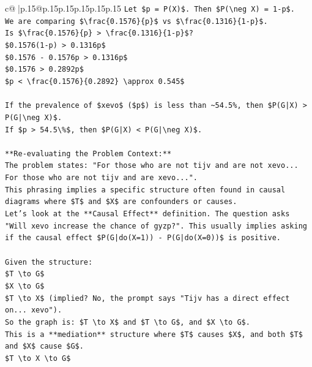\documentclass{article}
\begin{document}
{\begin{supertabular}{c@{$\;$}|p{.15\linewidth}@{}p{.15\linewidth}p{.15\linewidth}p{.15\linewidth}p{.15\linewidth}p{.15\linewidth}}
{{{\texttt{Let \$p = P(X)\$. Then \$P(\textbackslash{}neg X) = 1{-}p\$.} \\
\texttt{We are comparing \$\textbackslash{}frac\{0.1576\}\{p\}\$ vs \$\textbackslash{}frac\{0.1316\}\{1{-}p\}\$.} \\
\texttt{Is \$\textbackslash{}frac\{0.1576\}\{p\} > \textbackslash{}frac\{0.1316\}\{1{-}p\}\$?} \\
\texttt{\$0.1576(1{-}p) > 0.1316p\$} \\
\texttt{\$0.1576 {-} 0.1576p > 0.1316p\$} \\
\texttt{\$0.1576 > 0.2892p\$} \\
\texttt{\$p < \textbackslash{}frac\{0.1576\}\{0.2892\} \textbackslash{}approx 0.545\$} \\
\\ 
\texttt{If the prevalence of \$xevo\$ (\$p\$) is less than \textasciitilde{}54.5\%, then \$P(G|X) > P(G|\textbackslash{}neg X)\$.} \\
\texttt{If \$p > 54.5\textbackslash{}\%\$, then \$P(G|X) < P(G|\textbackslash{}neg X)\$.} \\
\\ 
\texttt{**Re{-}evaluating the Problem Context:**} \\
\texttt{The problem states: "For those who are not tijv and are not xevo... For those who are not tijv and are xevo...".} \\
\texttt{This phrasing implies a specific structure often found in causal diagrams where \$T\$ and \$X\$ are confounders or causes.} \\
\texttt{Let's look at the **Causal Effect** definition. The question asks "Will xevo increase the chance of gyzp?". This usually implies asking if the causal effect \$P(G|do(X=1)) {-} P(G|do(X=0))\$ is positive.} \\
\\ 
\texttt{Given the structure:} \\
\texttt{\$T \textbackslash{}to G\$} \\
\texttt{\$X \textbackslash{}to G\$} \\
\texttt{\$T \textbackslash{}to X\$ (implied? No, the prompt says "Tijv has a direct effect on... xevo").} \\
\texttt{So the graph is: \$T \textbackslash{}to X\$ and \$T \textbackslash{}to G\$, and \$X \textbackslash{}to G\$.} \\
\texttt{This is a **mediation** structure where \$T\$ causes \$X\$, and both \$T\$ and \$X\$ cause \$G\$.} \\
\texttt{\$T \textbackslash{}to X \textbackslash{}to G\$} \\
}}}
\end{supertabular}}
\end{document}
